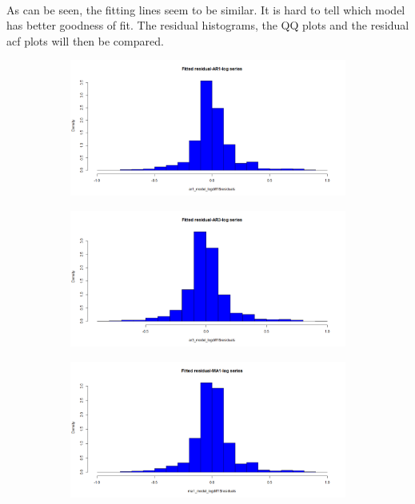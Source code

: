 \documentclass[12pt]{article}
\begin{document}
\paragraph{}
As can be seen, the fitting lines seem to be similar. It is hard to tell which model has better goodness of fit. The residual histograms, the QQ plots and the residual acf plots will then be compared. 
\begin{figure}[H]
  \centering
  \begin{subfigure}[b]{0.6\linewidth}
    \includegraphics[width=\linewidth]{figure11-1.png}
  \end{subfigure}
  \begin{subfigure}[b]{0.6\linewidth}
    \includegraphics[width=\linewidth]{figure11-2.png}
  \end{subfigure}
  \begin{subfigure}[b]{0.6\linewidth}
    \includegraphics[width=\linewidth]{figure11-3.png}

\end{subfigure}
\end{figure}
\end{document}
